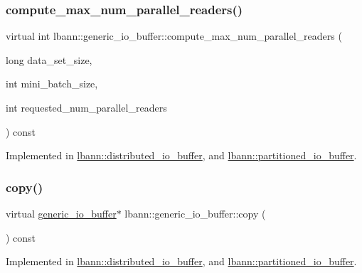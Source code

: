\subsubsection{\texorpdfstring{compute\+\_\+max\+\_\+num\+\_\+parallel\+\_\+readers()}{compute\_max\_num\_parallel\_readers()}}
{\footnotesize\ttfamily virtual int lbann\+::generic\+\_\+io\+\_\+buffer\+::compute\+\_\+max\+\_\+num\+\_\+parallel\+\_\+readers (\begin{DoxyParamCaption}\item[{long}]{data\+\_\+set\+\_\+size,  }\item[{int}]{mini\+\_\+batch\+\_\+size,  }\item[{int}]{requested\+\_\+num\+\_\+parallel\+\_\+readers }\end{DoxyParamCaption}) const\hspace{0.3cm}{\ttfamily [pure virtual]}}



Implemented in \hyperlink{classlbann_1_1distributed__io__buffer_af6653723714cf8cf51a928fc9f6e6728}{lbann\+::distributed\+\_\+io\+\_\+buffer}, and \hyperlink{classlbann_1_1partitioned__io__buffer_a5048100fb7cdc13908ecba6b4415b977}{lbann\+::partitioned\+\_\+io\+\_\+buffer}.

\mbox{\label{classlbann_1_1generic__io__buffer_a9d8020b82cf467c9148b0b37e7229262}} 
\subsubsection{\texorpdfstring{copy()}{copy()}}
{\footnotesize\ttfamily virtual \hyperlink{classlbann_1_1generic__io__buffer}{generic\+\_\+io\+\_\+buffer}$\ast$ lbann\+::generic\+\_\+io\+\_\+buffer\+::copy (\begin{DoxyParamCaption}{ }\end{DoxyParamCaption}) const\hspace{0.3cm}{\ttfamily [pure virtual]}}



Implemented in \hyperlink{classlbann_1_1distributed__io__buffer_a86a931528aa7a6e178cf6b55bf153881}{lbann\+::distributed\+\_\+io\+\_\+buffer}, and \hyperlink{classlbann_1_1partitioned__io__buffer_afce1a8859516dfaa482159806b75c263}{lbann\+::partitioned\+\_\+io\+\_\+buffer}.

